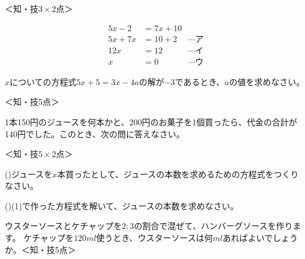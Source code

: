 \documentclass[
  12pt,a4paper,lualatex,ja=standard]{bxjsarticle}
\begin{document}
\begin{flushleft}
\begin{multicols}{2}
\begin{flushright}
\footnotesize{＜知・技$3 \times 2$点＞}
\end{flushright}

\columnbreak
\begin{screen}
\begin{align*}
5x - 2 &= 7x + 10 \\
5x + 7x &= 10 + 2  &\cdots \mbox{ア}\\
12x &= 12 &\cdots \mbox{イ}\\
x &= 0 &\cdots \mbox{ウ}
\end{align*}
\end{screen}
\end{multicols}

\vfill

\noindent{} \hspace{1pt}$x$についての方程式$5x + 5 = 3x -4a$の解が$-3$であるとき、$a$の値を求めなさい。
\begin{flushright}
\footnotesize{＜知・技5点＞}
\end{flushright}

\vfill

\newpage

\setcounter{skaunta}{0}
\noindent{} \hspace{1pt}1本150円のジュースを何本かと、200円のお菓子を1個買ったら、代金の合計が140円でした。このとき、次の問に答えなさい。

\begin{flushright}
\footnotesize{＜知・技$5 \times 2$点＞}
\end{flushright}


()\hspace{2.5pt}ジュースを$x$本買ったとして、ジュースの本数を求めるための方程式をつくりなさい。

\vfill

()\hspace{2.5pt}(1)で作った方程式を解いて、ジュースの本数を求めなさい。

\vfill

\noindent{} \hspace{1pt}ウスターソースとケチャップを$2 : 3$の割合で混ぜて、ハンバーグソースを作ります。
ケチャップを$120 \si{ml}$使うとき、ウスターソースは何$\si{ml}$あればよいでしょうか。＜知・技5点＞


\end{flushleft}
\end{document}
